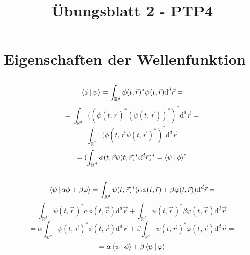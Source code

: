 \documentclass[a4paper,11pt]{article}
\title{Übungsblatt 2 - PTP4}
\author{}
\date{}
\begin{document}
\maketitle

\section{Eigenschaften der Wellenfunktion}

\subsection{}
\begin{equation}
        \Braket{\phi | \psi} = \int_{\mathbb{R}^d}\phi(t,\vec{r})^*\psi(t,\vec{r})\text{d}^d\vec{r} =
\end{equation}
\begin{equation}
        =  \int_{\mathbb{R}^d}((\phi(t,\vec{r})^*(\psi(t,\vec{r}))^*)^*\text{d}^d\vec{r} =
\end{equation}
\begin{equation}
        =  \int_{\mathbb{R}^d}(\phi(t,\vec{r}\psi(t,\vec{r})^*)^*\text{d}^d\vec{r} = 
\end{equation}
\begin{equation}
        = (\int_{\mathbb{R}^d}\phi(t,\vec{r}\psi(t,\vec{r})^*\text{d}^d\vec{r})^* = \Braket{\psi|\phi}^*
\end{equation}

\subsection{}
\begin{equation}
        \Braket{\psi|\alpha\phi + \beta\varphi} = \int_{\mathbb{R}^d}\psi(t,\vec{r})^*(\alpha\phi(t,\vec{r}) + \beta\varphi(t,\vec{r}))\text{d}^d\vec{r} =
\end{equation}
\begin{equation}
        = \int_{\mathbb{R}^d}\psi(t,\vec{r})^*\alpha\phi(t,\vec{r})\text{d}^d\vec{r} + \int_{\mathbb{R}^d}\psi(t,\vec{r})^*\beta\varphi(t,\vec{r})\text{d}^d\vec{r} =
\end{equation}
\begin{equation}
        = \alpha\int_{\mathbb{R}^d}\psi(t,\vec{r})^*\phi(t,\vec{r})\text{d}^d\vec{r} + \beta\int_{\mathbb{R}^d}\psi(t,\vec{r})^*\varphi(t,\vec{r})\text{d}^d\vec{r} =
\end{equation}
\begin{equation}
        = \alpha\Braket{\psi|\phi} + \beta\Braket{\psi|\varphi}
\end{equation}
\end{document}
